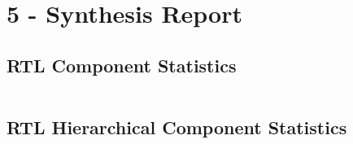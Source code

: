 \documentclass[11pt]{report}
\begin{document}
\newpage
\section*{5 - Synthesis Report}
\subsection*{RTL Component Statistics}
\inputminted[firstline=128,lastline=151]{text}{../../../DE_Project_T1/DE_Project_T1.runs/synth_1/TOP_LEVEL.vds}
\newpage
\subsection*{RTL Hierarchical Component Statistics}
\inputminted[firstline=154,lastline=208]{text}{../../../DE_Project_T1/DE_Project_T1.runs/synth_1/TOP_LEVEL.vds}
\end{document}
